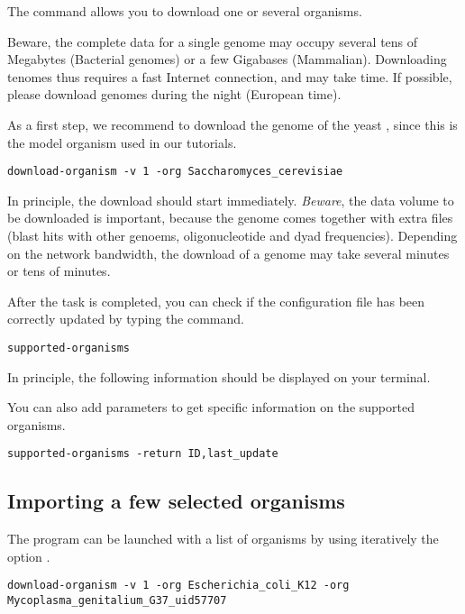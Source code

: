 The command  allows you to download one or
several organisms. 

Beware, the complete data for a single genome may occupy several tens
of Megabytes (Bacterial genomes) or a few Gigabases
(Mammalian). Downloading tenomes thus requires a fast Internet
connection, and may take time. If possible, please download genomes
during the night (European time).

As a first step, we recommend to download the genome of the yeast
, since this is the model organism used
in our tutorials.


\begin{lstlisting}
download-organism -v 1 -org Saccharomyces_cerevisiae
\end{lstlisting}

In principle, the download should start immediately. \emph{Beware},
the data volume to be downloaded is important, because the genome
comes together with extra files (blast hits with other genoems,
oligonucleotide and dyad frequencies). Depending on the network
bandwidth, the download of a genome may take several minutes or tens
of minutes. 

After the task is completed, you can check if the configuration file
has been correctly updated by typing the command.

\begin{lstlisting}
supported-organisms
\end{lstlisting}

In principle, the following information should be displayed on your
terminal.


You can also add parameters to get specific information on the
supported organisms.

\begin{lstlisting}
supported-organisms -return ID,last_update
\end{lstlisting}


\subsection{Importing a few selected organisms}

The program  can be launched with a list of
organisms by using iteratively the option .


\begin{lstlisting}
download-organism -v 1 -org Escherichia_coli_K12 -org Mycoplasma_genitalium_G37_uid57707
\end{lstlisting}

